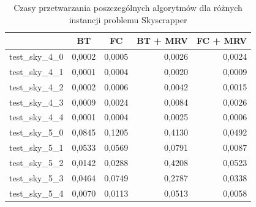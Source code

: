 \documentclass{article}
\begin{document}
	\begin{table}[H]
		\caption{Czasy przetwarzania poszczególnych algorytmów dla różnych instancji problemu Skyscrapper}
		\label{tab:skyscrapper_times}
		\begin{center}
			\begin{tabular}{|l|r|r|r|r|}
				\hline
				& \multicolumn{1}{c|}{\textbf{BT}} & \multicolumn{1}{c|}{\textbf{FC}} & \multicolumn{1}{l|}{\textbf{BT + MRV}} & \multicolumn{1}{l|}{\textbf{FC + MRV}} \\ \hline
				test\_sky\_4\_0 & 0,0002                           & 0,0005                           & 0,0026                                 & 0,0024                                 \\ \hline
				test\_sky\_4\_1 & 0,0001                           & 0,0004                           & 0,0020                                 & 0,0009                                 \\ \hline
				test\_sky\_4\_2 & 0,0002                           & 0,0006                           & 0,0042                                 & 0,0015                                 \\ \hline
				test\_sky\_4\_3 & 0,0009                           & 0,0024                           & 0,0084                                 & 0,0026                                 \\ \hline
				test\_sky\_4\_4 & 0,0001                           & 0,0004                           & 0,0025                                 & 0,0006                                 \\ \hline
				test\_sky\_5\_0 & 0,0845                           & 0,1205                           & 0,4130                                 & 0,0492                                 \\ \hline
				test\_sky\_5\_1 & 0,0533                           & 0,0569                           & 0,0791                                 & 0,0087                                 \\ \hline
				test\_sky\_5\_2 & 0,0142                           & 0,0288                           & 0,4208                                 & 0,0523                                 \\ \hline
				test\_sky\_5\_3 & 0,0464                           & 0,0749                           & 0,2787                                 & 0,0338                                 \\ \hline
				test\_sky\_5\_4 & 0,0070                           & 0,0113                           & 0,0513                                 & 0,0058                                 \\ \hline

\end{tabular}
\end{center}
\end{table}
\end{document}

